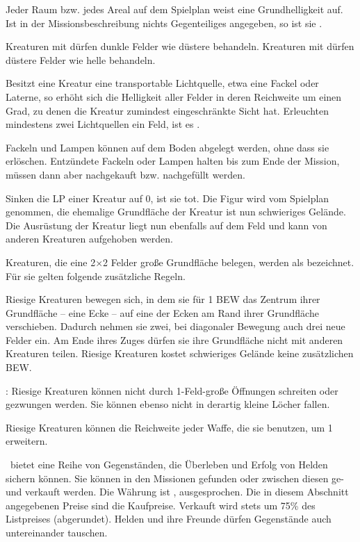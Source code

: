 {		Jeder Raum bzw. jedes Areal auf dem Spielplan weist eine Grundhelligkeit auf. Ist in der Missionsbeschreibung nichts Gegenteiliges angegeben, so ist sie .

		Kreaturen mit  dürfen dunkle Felder wie düstere behandeln. Kreaturen mit  dürfen düstere Felder wie helle behandeln.

			Besitzt eine Kreatur eine transportable Lichtquelle, etwa eine Fackel oder Laterne, so erhöht sich die Helligkeit aller Felder in deren Reichweite um einen Grad, zu denen die Kreatur zumindest eingeschränkte Sicht hat. Erleuchten mindestens zwei Lichtquellen ein Feld, ist es .

			Fackeln und Lampen können auf dem Boden abgelegt werden, ohne dass sie erlöschen. Entzündete Fackeln oder Lampen halten bis zum Ende der Mission, müssen dann aber nachgekauft bzw. nachgefüllt werden.

		Sinken die LP einer Kreatur auf 0, ist sie tot. Die Figur wird vom Spielplan genommen, die ehemalige Grundfläche der Kreatur ist nun schwieriges Gelände. Die Ausrüstung der Kreatur liegt nun ebenfalls auf dem Feld und kann von anderen Kreaturen aufgehoben werden.

		Kreaturen, die eine 2×2 Felder große Grundfläche belegen, werden als  bezeichnet. Für sie gelten folgende zusätzliche Regeln.

		 Riesige Kreaturen bewegen sich, in dem sie für 1 BEW das Zentrum ihrer Grundfläche -- eine Ecke -- auf eine der Ecken am Rand ihrer Grundfläche verschieben. Dadurch nehmen sie zwei, bei diagonaler Bewegung auch drei neue Felder ein. Am Ende ihres Zuges dürfen sie ihre Grundfläche nicht mit anderen Kreaturen teilen. Riesige Kreaturen kostet schwieriges Gelände keine zusätzlichen BEW.

		: Riesige Kreaturen können nicht durch 1-Feld-große Öffnungen schreiten oder gezwungen werden. Sie können ebenso nicht in derartig kleine Löcher fallen.

		 Riesige Kreaturen können die Reichweite jeder Waffe, die sie benutzen, um 1 erweitern.

		\bmh~bietet eine Reihe von Gegenständen, die Überleben und Erfolg von Helden sichern können. Sie können in den Missionen gefunden oder zwischen diesen ge- und verkauft werden. Die Währung ist ,  ausgesprochen. Die in diesem Abschnitt angegebenen Preise sind die Kaufpreise. Verkauft wird stets um 75\% des Listpreises (abgerundet). Helden und ihre Freunde dürfen Gegenstände auch untereinander tauschen.

}
